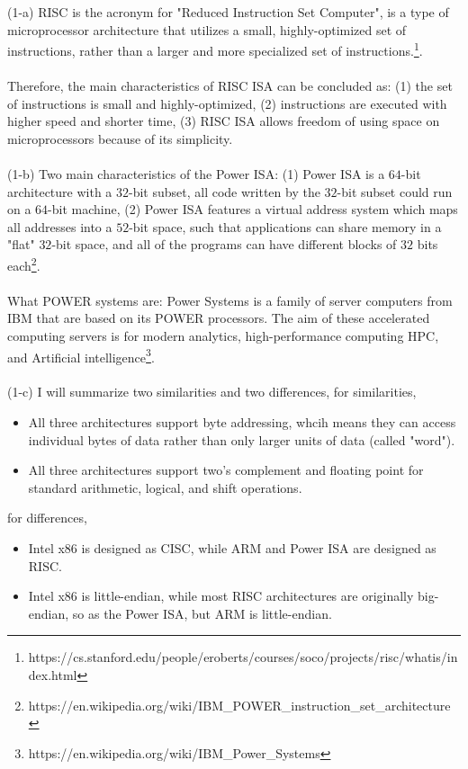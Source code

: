 \documentclass[11pt]{article}
\begin{document}
\begin{solution}
(1-a) RISC is the acronym for "Reduced Instruction Set Computer", is a type of microprocessor architecture that utilizes a small, highly-optimized set of instructions, rather than a larger and more specialized set of instructions.\footnote{https://cs.stanford.edu/people/eroberts/courses/soco/projects/risc/whatis/index.html}.
\\
\\
Therefore, the main characteristics of RISC ISA can be concluded as: (1) the set of instructions is small and highly-optimized, (2) instructions are executed with higher speed and shorter time, (3) RISC ISA allows freedom of using space on microprocessors because of its simplicity.
\\
\\
(1-b) Two main characteristics of the Power ISA: (1) Power ISA is a $64$-bit architecture with a $32$-bit subset, all code written by the $32$-bit subset could run on a $64$-bit machine, (2) Power ISA features a virtual address system which maps all addresses into a $52$-bit space, such that applications can share memory in a "flat" $32$-bit space, and all of the programs can have different blocks of $32$ bits each\footnote{https://en.wikipedia.org/wiki/IBM\_POWER\_instruction\_set\_architecture}.
\\
\\
What POWER systems are: Power Systems is a family of server computers from IBM that are based on its POWER processors. The aim of these accelerated computing servers is for modern analytics, high-performance computing HPC, and Artificial intelligence\footnote{https://en.wikipedia.org/wiki/IBM\_Power\_Systems}. 
\\
\\
(1-c) I will summarize two similarities and two differences, for similarities,
\begin{itemize}
\item All three architectures support byte addressing, whcih means they can access individual bytes of data rather than only larger units of data (called "word").
\item All three architectures support two's complement and floating point for standard arithmetic, logical, and shift operations.
\end{itemize}
for differences,
\begin{itemize}
\item Intel x86 is designed as CISC, while ARM and Power ISA are designed as RISC.
\item Intel x86 is little-endian, while most RISC architectures are originally big-endian, so as the Power ISA, but ARM is little-endian.

\end{itemize}
\end{solution}
\end{document}
